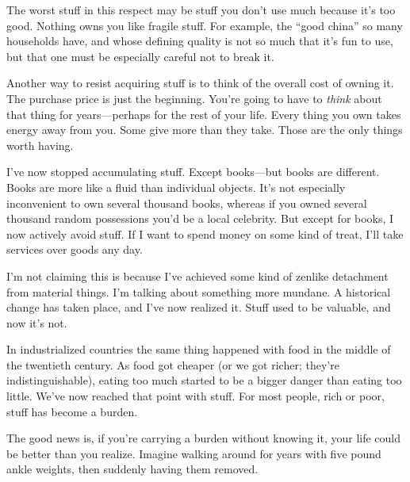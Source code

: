 The worst stuff in this respect may be stuff you don't use much because
it's too good. Nothing owns you like fragile stuff. For example, the
``good china'' so many households have, and whose defining quality is
not so much that it's fun to use, but that one must be especially
careful not to break it.

Another way to resist acquiring stuff is to think of the overall cost of
owning it. The purchase price is just the beginning. You're going to
have to \emph{think} about that thing for years---perhaps for the rest
of your life. Every thing you own takes energy away from you. Some give
more than they take. Those are the only things worth having.

I've now stopped accumulating stuff. Except books---but books are
different. Books are more like a fluid than individual objects. It's not
especially inconvenient to own several thousand books, whereas if you
owned several thousand random possessions you'd be a local celebrity.
But except for books, I now actively avoid stuff. If I want to spend
money on some kind of treat, I'll take services over goods any day.

I'm not claiming this is because I've achieved some kind of zenlike
detachment from material things. I'm talking about something more
mundane. A historical change has taken place, and I've now realized it.
Stuff used to be valuable, and now it's not.

In industrialized countries the same thing happened with food in the
middle of the twentieth century. As food got cheaper (or we got richer;
they're indistinguishable), eating too much started to be a bigger
danger than eating too little. We've now reached that point with stuff.
For most people, rich or poor, stuff has become a burden.

The good news is, if you're carrying a burden without knowing it, your
life could be better than you realize. Imagine walking around for years
with five pound ankle weights, then suddenly having them removed.
